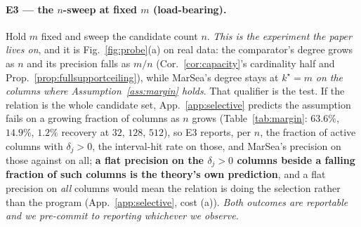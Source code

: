 \documentclass{article}
\begin{document}
\paragraph{E3 --- the $n$-sweep at fixed $m$ (load-bearing).} Hold $m$ fixed and sweep the
candidate count $n$. \emph{This is the experiment the paper lives on}, and it is
Fig.~\ref{fig:probe}(a) on real data: the comparator's degree grows as $n$ and its precision
falls as $m/n$ (Cor.~\ref{cor:capacity}'s cardinality half and Prop.~\ref{prop:fullsupportceiling}),
while MarSea's degree stays at $k^\star=m$ \emph{on the columns where Assumption~\ref{ass:margin}
holds}. That qualifier is the test. If the relation is the whole candidate set, App.~\ref{app:selective}
predicts the assumption fails on a growing fraction of columns as $n$ grows
(Table~\ref{tab:margin}: $63.6\%$, $14.9\%$, $1.2\%$ recovery at $32$, $128$, $512$), so E3
reports, per $n$, the fraction of active columns with $\delta_j>0$, the interval-hit rate on
those, and MarSea's precision on those against on all; \textbf{a flat precision on the
$\delta_j>0$ columns beside a falling fraction of such columns is the theory's own prediction},
and a flat precision on \emph{all} columns would mean the relation is doing the selection rather
than the program (App.~\ref{app:selective}, cost (a)). \emph{Both outcomes are reportable and we
pre-commit to reporting whichever we observe.}
\end{document}
